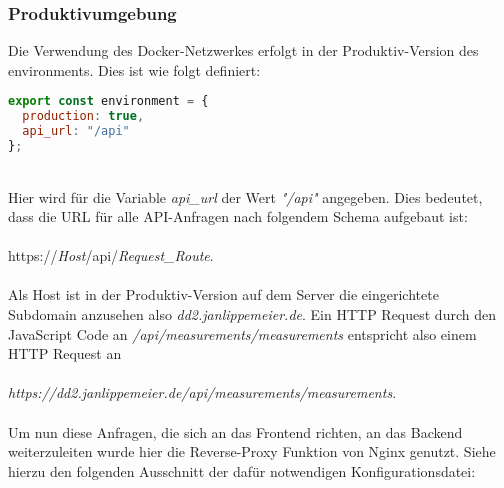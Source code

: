 \subsubsection{Produktivumgebung}
Die Verwendung des Docker-Netzwerkes erfolgt in der Produktiv-Version des environments. Dies ist wie folgt definiert: 

\begin{lstlisting}[language={JavaScript}, caption={Produktivvariablen}, captionpos=b, label={fig:environment prod}]
export const environment = {
  production: true,
  api_url: "/api"
};
\end{lstlisting}
~\\Hier wird für die Variable \textit{api\_url} der Wert \textit{"/api"} angegeben. Dies bedeutet, dass die URL für alle API-Anfragen nach folgendem Schema aufgebaut ist: \\\\
https://\textit{Host}/api/\textit{Request\_Route}.\\\\
Als Host ist in der Produktiv-Version auf dem Server die eingerichtete Subdomain anzusehen also \textit{dd2.janlippemeier.de}. 
Ein HTTP Request durch den JavaScript Code an \textit{/api/measurements/measurements} entspricht also einem 
HTTP Request an\\\\
\textit{https://dd2.janlippemeier.de/api/measurements/measurements}. \\\\
Um nun diese Anfragen, die sich an das Frontend richten, an das Backend weiterzuleiten wurde hier die Reverse-Proxy Funktion von Nginx genutzt. 
Siehe hierzu den folgenden Ausschnitt der dafür notwendigen Konfigurationsdatei: ~\\


